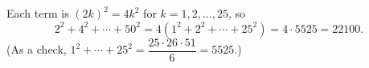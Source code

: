 Each term is $(2k)^2=4k^2$ for $k=1,2,\dots,25$, so
\[
2^2+4^2+\cdots+50^2=4\left(1^2+2^2+\cdots+25^2\right)=4\cdot5525=\boxed{22100}.
\]
(As a check, $1^2+\cdots+25^2=\dfrac{25\cdot26\cdot51}{6}=5525$.)
